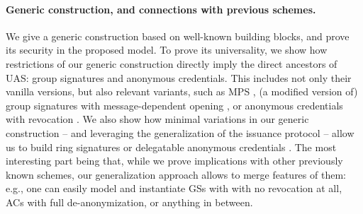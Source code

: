 \paragraph{Generic construction, and connections with previous schemes.} %
We give a generic construction based on well-known building blocks, and prove
its security in the proposed model. To prove its universality, we show how
restrictions of our generic construction directly imply the direct ancestors of
UAS: group signatures and anonymous credentials. This includes not only their
vanilla versions, but also relevant variants, such as MPS \needcite, (a modified
version of) group signatures with message-dependent opening \cite{seh+12}, or
anonymous credentials with revocation \cite{cks10}. We also show how minimal
variations in our generic construction -- and leveraging the generalization of
the issuance protocol -- allow us to build ring signatures \cite{rst06} or
delegatable anonymous credentials \cite{bcc+09}. The most interesting part being
that, while we prove implications with other previously known schemes, our
generalization approach allows to merge features of them: e.g., one can easily
model and instantiate GSs with with no revocation at all, ACs with full
de-anonymization, or anything in between.

